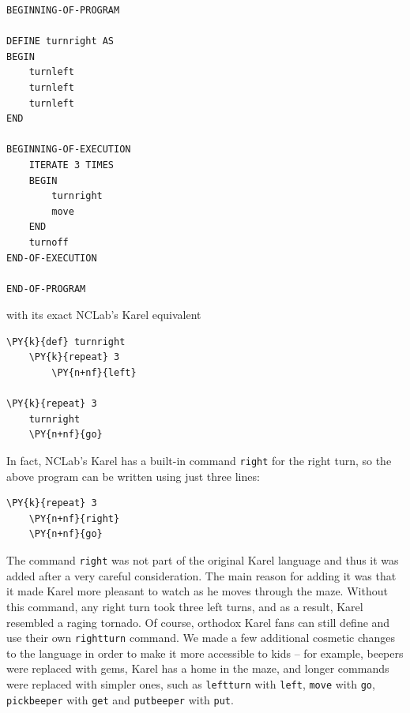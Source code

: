\begin{bbox}
\begin{verbatim}
BEGINNING-OF-PROGRAM
 
DEFINE turnright AS
BEGIN
    turnleft
    turnleft
    turnleft
END
 
BEGINNING-OF-EXECUTION
    ITERATE 3 TIMES
    BEGIN
        turnright
        move
    END
    turnoff
END-OF-EXECUTION
 
END-OF-PROGRAM
\end{verbatim}
\end{bbox}
\vspace{6mm}

\noindent
with its exact NCLab's Karel equivalent\\

\begin{bbox}
\begin{Verbatim}[commandchars=\\\{\}]
\PY{k}{def} turnright
    \PY{k}{repeat} 3
        \PY{n+nf}{left}
 
\PY{k}{repeat} 3
    turnright
    \PY{n+nf}{go}
\end{Verbatim}
\end{bbox}
\vspace{6mm}

\noindent
In fact, NCLab's Karel has a built-in command {\tt right} for the
right turn, so the above program can be written using just three lines:\\

\begin{bbox}
\begin{Verbatim}[commandchars=\\\{\}]
\PY{k}{repeat} 3
    \PY{n+nf}{right}
    \PY{n+nf}{go}
\end{Verbatim}
\end{bbox}
\vspace{6mm}

\noindent
The command {\tt right} was not part of the original Karel language  and thus 
it was added after a very careful consideration. The main reason for adding it was that it made 
Karel more pleasant to watch as he moves through the maze. Without this command, any right turn 
took three left turns, and as a result, Karel resembled a raging tornado.
Of course, orthodox Karel fans can still define and use their own {\tt rightturn} 
command. We made a few additional cosmetic changes to the language in order to make 
it more accessible to kids -- for example, beepers were replaced with gems, Karel 
has a home in the maze, and longer commands were replaced with simpler ones, such as 
{\tt leftturn} with {\tt left}, {\tt move} with {\tt go}, 
{\tt pickbeeper} with {\tt get} and {\tt putbeeper} with {\tt put}. 

